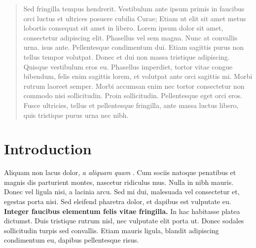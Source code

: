 \documentclass[a0,landscape]{a0poster}
\begin{document}
\vspace{1cm} %


\begin{multicols}{4} %


\color{Navy} %

\begin{abstract}

Sed fringilla tempus hendrerit. Vestibulum ante ipsum primis in faucibus orci luctus et ultrices posuere cubilia Curae; Etiam ut elit sit amet metus lobortis consequat sit amet in libero. Lorem ipsum dolor sit amet, consectetur adipiscing elit. Phasellus vel sem magna. Nunc at convallis urna. isus ante. Pellentesque condimentum dui. Etiam sagittis purus non tellus tempor volutpat. Donec et dui non massa tristique adipiscing. Quisque vestibulum eros eu. Phasellus imperdiet, tortor vitae congue bibendum, felis enim sagittis lorem, et volutpat ante orci sagittis mi. Morbi rutrum laoreet semper. Morbi accumsan enim nec tortor consectetur non commodo nisi sollicitudin. Proin sollicitudin. Pellentesque eget orci eros. Fusce ultricies, tellus et pellentesque fringilla, ante massa luctus libero, quis tristique purus urna nec nibh.

\end{abstract}


\color{SaddleBrown} %

\section*{Introduction}

Aliquam non lacus dolor, \textit{a aliquam quam} \cite{Smith:2012qr}. Cum sociis natoque penatibus et magnis dis parturient montes, nascetur ridiculus mus. Nulla in nibh mauris. Donec vel ligula nisi, a lacinia arcu. Sed mi dui, malesuada vel consectetur et, egestas porta nisi. Sed eleifend pharetra dolor, et dapibus est vulputate eu. \textbf{Integer faucibus elementum felis vitae fringilla.} In hac habitasse platea dictumst. Duis tristique rutrum nisl, nec vulputate elit porta ut. Donec sodales sollicitudin turpis sed convallis. Etiam mauris ligula, blandit adipiscing condimentum eu, dapibus pellentesque risus.


\end{multicols}
\end{document}
